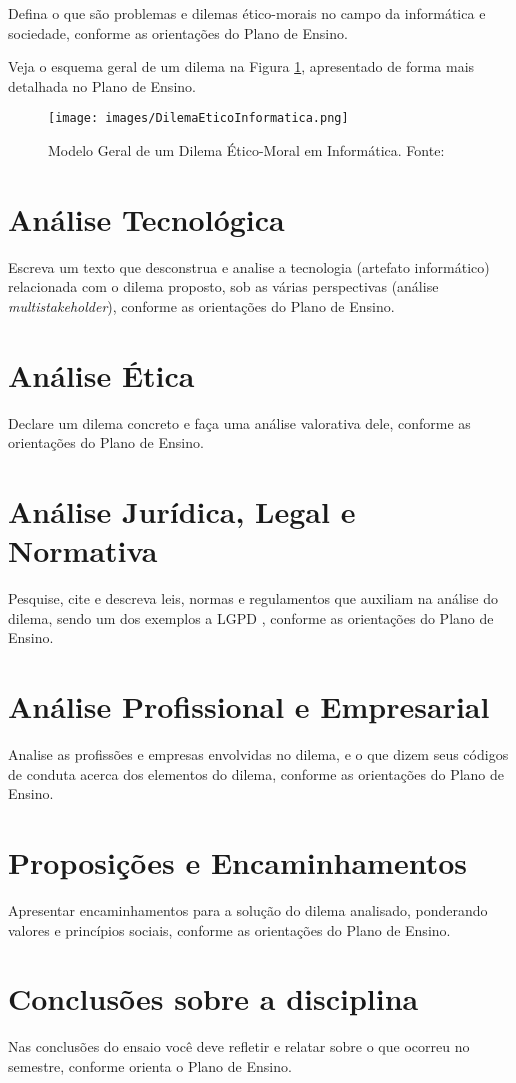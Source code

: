 \documentclass[12pt]{article}
\begin{document}
Defina o que são problemas e dilemas ético-morais no campo da informática e sociedade, conforme as orientações do Plano de Ensino.

Veja o esquema geral de um dilema na Figura \ref{fig:dilema}, apresentado de forma mais detalhada no Plano de Ensino.

\begin{figure}
    \centering
    \texttt{[image: images/DilemaEticoInformatica.png]}
    \caption{Modelo Geral de um Dilema Ético-Moral em Informática. Fonte: \cite{fernandes_texto_2024-1}}
    \label{fig:dilema}
\end{figure}

\section{Análise Tecnológica} 

Escreva um texto que desconstrua e analise a tecnologia (artefato informático) relacionada com o dilema proposto, sob as várias perspectivas (análise \textit{multistakeholder}), conforme as orientações do Plano de Ensino.
	
\section{Análise Ética}
	
Declare um dilema concreto e faça uma análise valorativa dele, conforme as orientações do Plano de Ensino.
 
\section{Análise Jurídica, Legal e Normativa}
	
Pesquise, cite e descreva leis, normas e regulamentos que auxiliam na análise do dilema, sendo um dos exemplos a LGPD \cite{brasil_lei_2018}, 
conforme as orientações do Plano de Ensino.

\section{Análise Profissional e Empresarial}
	
Analise as profissões e empresas envolvidas no dilema, e o que dizem seus códigos de conduta acerca dos elementos do dilema, 
conforme as orientações do Plano de Ensino.

\section{Proposições e Encaminhamentos}
	
Apresentar encaminhamentos para a solução do dilema analisado, ponderando valores e princípios sociais,
conforme as orientações do Plano de Ensino.

\section{Conclusões sobre a disciplina}
	
Nas conclusões do ensaio você deve refletir e relatar sobre o que ocorreu no semestre, conforme orienta o Plano de Ensino.

\label{referencias}
\printbibliography
\end{document}
